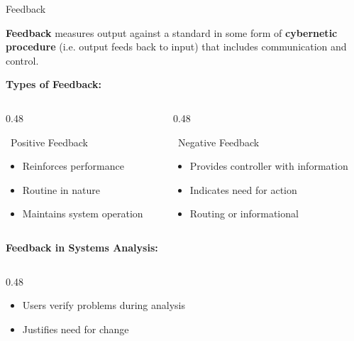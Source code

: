 \documentclass[aspectratio=169]{beamer}
\begin{document}
\begin{frame}{Feedback}
    \begin{definition}
        \textbf{Feedback} measures output against a standard in some form of \textbf{cybernetic procedure} (i.e. output feeds back to input) that includes communication and control.
    \end{definition}
    
    \vspace{0.1cm}
    \textbf{Types of Feedback:}
    
    \begin{columns}
        \begin{column}{0.48\textwidth}
            \begin{block}{\faThumbsUp\, Positive Feedback}
                \begin{itemize}
                    \item Reinforces performance
                    \item Routine in nature
                    \item Maintains system operation
                \end{itemize}
            \end{block}
        \end{column}
        \begin{column}{0.48\textwidth}
            \begin{block}{\faExclamationCircle\, Negative Feedback}
                \begin{itemize}
                    \item Provides controller with information
                    \item Indicates need for action
                    \item Routing or informational
                \end{itemize}
            \end{block}
        \end{column}
    \end{columns}
    
    \vspace{0.1cm}
\textbf{Feedback in Systems Analysis:}
    \begin{columns}
        \begin{column}{0.48\textwidth} 

            \begin{itemize}
                \item Users verify problems during analysis
                \item Justifies need for change 
            \end{itemize}
    

\end{column}
\end{columns}
\end{frame}
\end{document}
